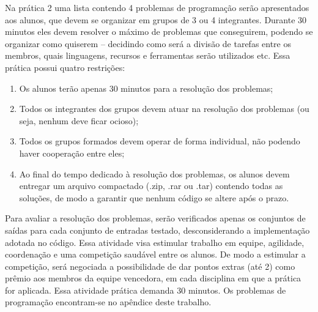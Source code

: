 Na prática 2 uma lista contendo 4 problemas de programação serão apresentados aos alunos, que devem se organizar em grupos de 3 ou 4 integrantes. Durante 30 minutos eles devem resolver o máximo de problemas que conseguirem, podendo se organizar como quiserem -- decidindo como será a divisão de tarefas entre os membros, quais linguagens, recursos e ferramentas serão utilizados etc. Essa prática possui quatro restrições: 
    \begin{enumerate}\setlength\itemsep{0.5em}
        \item Os alunos terão apenas 30 minutos para a resolução dos problemas;
        \item Todos os integrantes dos grupos devem atuar na resolução dos problemas (ou seja, nenhum deve ficar ocioso);
        \item Todos os grupos formados devem operar de forma individual, não podendo haver cooperação entre eles;
        \item Ao final do tempo dedicado à resolução dos problemas, os alunos devem entregar um arquivo compactado (.zip, .rar ou .tar) contendo todas as soluções, de modo a garantir que nenhum código se altere após o prazo.
    \end{enumerate}
Para avaliar a resolução dos problemas, serão verificados apenas os conjuntos de saídas para cada conjunto de entradas testado, desconsiderando a implementação adotada no código. Essa atividade visa estimular trabalho em equipe, agilidade, coordenação e uma competição saudável entre os alunos. De modo a estimular a competição, será negociada a possibilidade de dar pontos extras (até 2) como prêmio aos membros da equipe vencedora, em cada disciplina em que a prática for aplicada. Essa atividade prática demanda 30 minutos. Os problemas de programação encontram-se no apêndice deste trabalho. 

